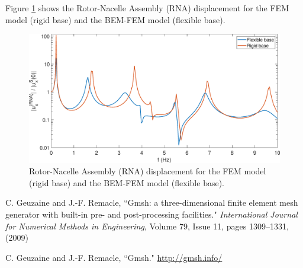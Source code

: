 \documentclass[a4]{article}
\begin{document}
Figure \ref{fig:results} shows the Rotor-Nacelle Assembly (RNA) displacement for the FEM model (rigid base) and the BEM-FEM model (flexible base).

\begin{figure}[tbh!]
	\centering
	\includegraphics[scale=0.5]{wind_turbine.eps}
	\caption{Rotor-Nacelle Assembly (RNA) displacement for the FEM model (rigid base) and the BEM-FEM model (flexible base).}
	\label{fig:results}
\end{figure}

\FloatBarrier

\begin{thebibliography}{99}
	
	 C. Geuzaine and J.-F. Remacle, ``Gmsh: a three-dimensional finite element mesh generator with built-in pre- and post-processing facilities." \emph{International Journal for Numerical Methods in Engineering}, Volume 79, Issue 11, pages 1309--1331, (2009)
	
	 C. Geuzaine and J.-F. Remacle, ``Gmsh." \url{http://gmsh.info/}

\end{thebibliography}
\end{document}
